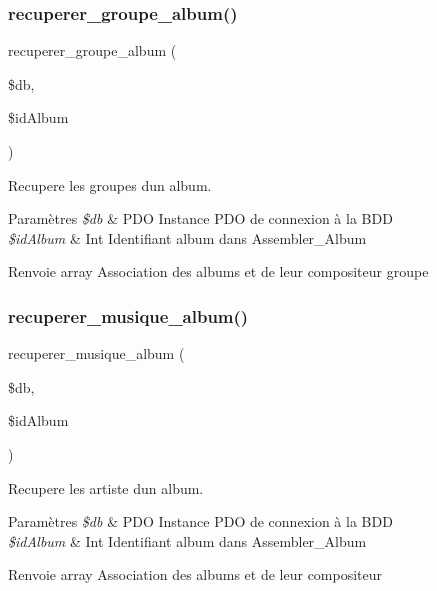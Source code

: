 \subsubsection{\texorpdfstring{recuperer\+\_\+groupe\+\_\+album()}{recuperer\_groupe\_album()}}
{\footnotesize\ttfamily recuperer\+\_\+groupe\+\_\+album (\begin{DoxyParamCaption}\item[{}]{\$db,  }\item[{}]{\$id\+Album }\end{DoxyParamCaption})}



Recupere les groupes d\textquotesingle{}un album. 


\begin{DoxyParams}{Paramètres}
{\em \$db} & P\+DO Instance P\+DO de connexion à la B\+DD \\
\hline
{\em \$id\+Album} & Int Identifiant album dans Assembler\+\_\+\+Album \\
\hline
\end{DoxyParams}
\begin{DoxyReturn}{Renvoie}
array Association des albums et de leur compositeur groupe 
\end{DoxyReturn}
\mbox{\label{fonctionAlbum_8php_a5162fc7335e65ca622c67dc921a308ac}} 
\subsubsection{\texorpdfstring{recuperer\+\_\+musique\+\_\+album()}{recuperer\_musique\_album()}}
{\footnotesize\ttfamily recuperer\+\_\+musique\+\_\+album (\begin{DoxyParamCaption}\item[{}]{\$db,  }\item[{}]{\$id\+Album }\end{DoxyParamCaption})}



Recupere les artiste d\textquotesingle{}un album. 


\begin{DoxyParams}{Paramètres}
{\em \$db} & P\+DO Instance P\+DO de connexion à la B\+DD \\
\hline
{\em \$id\+Album} & Int Identifiant album dans Assembler\+\_\+\+Album \\
\hline
\end{DoxyParams}
\begin{DoxyReturn}{Renvoie}
array Association des albums et de leur compositeur 
\end{DoxyReturn}
\mbox{\label{fonctionAlbum_8php_af82f3b33c72efc21b92271e6ab963c2f}} 
